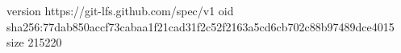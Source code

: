 version https://git-lfs.github.com/spec/v1
oid sha256:77dab850accf73cabaa1f21cad31f2c52f2163a5cd6cb702c88b97489dce4015
size 215220
